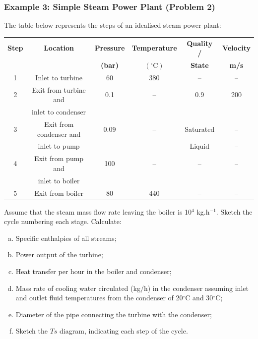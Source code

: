 \documentclass[10pt,compress]{beamer}
\begin{document}
\begin{frame}
 \frametitle{Example 3: Simple Steam Power Plant (Problem 2)}
 \scriptsize
   The table below represents the steps of an idealised steam power plant:
    \begin{center}
     \begin{tabular}{||c | c | c | c | c | c ||}
      \hline\hline
       {\bf Step} & {\bf Location}       & {\bf Pressure}  & {\bf Temperature}     & {\bf Quality /}  &{\bf Velocity}    \\
                  &                      & {\bf (bar)}     &{\bf$\left(^{\circ}\text{C}\right)$}& {\bf State} & {\bf m/s} \\
      \hline\hline
          1       & Inlet to turbine     &   60            &   380                 &  --              &       --         \\
      \hline
          2       & Exit from turbine and&   0.1           &    --                 & 0.9              &  200             \\
                  & inlet to condenser   &                 &                       &                  &                  \\ 
      \hline
          3       & Exit from condenser and&  0.09         &  --                   & Saturated        &  --              \\
                  & inlet to pump        &                 &                       & Liquid           &   --             \\
      \hline
          4       & Exit from pump and   &  100            &   --                  &     --           &   --             \\
                  & inlet to boiler      &                 &                       &                  &                  \\
      \hline 
          5       & Exit from boiler     &  80             &  440                  &      --          &    --            \\
           \hline\hline
     \end{tabular}
    \end{center}
    Assume that the steam mass flow rate leaving the boiler is 10$^{4}$ kg.h$^{-1}$. Sketch the cycle numbering each stage. Calculate:
      \begin{enumerate}[(a)]
         \item Specific enthalpies of all streams;
         \item Power output of the turbine;
         \item Heat transfer per hour in the boiler and condenser;
         \item Mass rate of cooling water circulated (kg/h) in the condenser assuming inlet and outlet fluid temperatures from the condenser of 20$^{\circ}$C and 30$^{\circ}$C;
         \item Diameter of the pipe connecting the turbine with the condenser;
         \item Sketch the $Ts$ diagram, indicating each step of the cycle.
    \end{enumerate}
 \normalsize
\end{frame}
\end{document}
